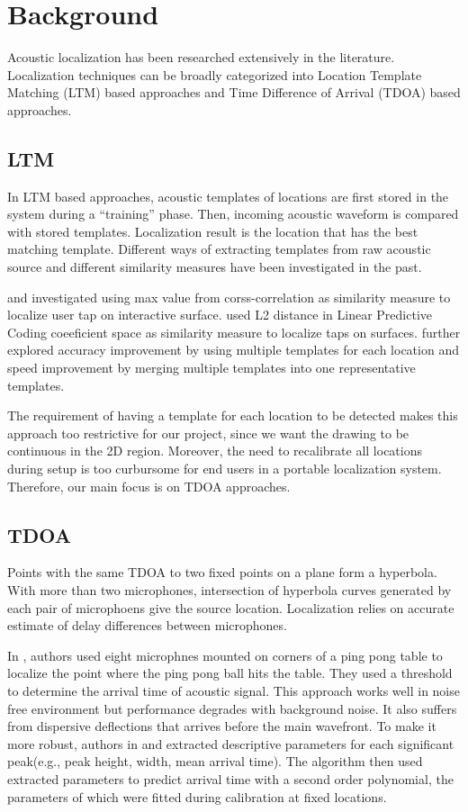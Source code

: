 \section{Background}
Acoustic localization has been researched extensively in the literature. Localization techniques can be broadly categorized into Location Template Matching (LTM) based approaches and Time Difference of Arrival (TDOA) based approaches.

\subsection{LTM}
In LTM based approaches, acoustic templates of locations are first stored in the system during a ``training'' phase. Then, incoming acoustic waveform is compared with stored templates. Localization result is the location that has the best matching template. Different ways of extracting templates from raw acoustic source and different similarity measures have been investigated in the past. 

\cite{extended:tusi} and \cite{ltm:pham} investigated using max value from corss-correlation as similarity measure to localize user tap on interactive surface. \cite{ltm:lpc} used L2 distance in Linear Predictive Coding coeeficient space as similarity measure to localize taps on surfaces. \cite{ltm:tusi2} further explored accuracy improvement by using multiple templates for each location and speed improvement by merging multiple templates into one representative templates.

The requirement of having a template for each location to be detected makes this approach too restrictive for our project, since we want the drawing to be continuous in the 2D region.  Moreover, the need to recalibrate all locations during setup is too curbursome for end users in a portable localization system. Therefore, our main focus is on TDOA approaches.

\subsection{TDOA}
Points with the same TDOA to two fixed points on a plane form a hyperbola. With more than two microphones, intersection of hyperbola curves generated by each pair of microphoens give the source location.  Localization relies on accurate estimate of delay differences between microphones. 

In \cite{tdoa:ppp}, authors used eight microphnes mounted on corners of a ping pong table to localize the point where the ping pong ball hits the table. They used a threshold to determine the arrival time of acoustic signal. This approach works well in noise free environment but performance degrades with background noise. It also suffers from dispersive deflections that arrives before the main wavefront. To make it more robust, authors in \cite{tdoa:mit3} and \cite{tdoa:mit4} extracted descriptive parameters for each significant peak(e.g., peak height, width, mean arrival time). The algorithm then used extracted parameters to predict arrival time with a second order polynomial, the parameters of which were fitted during calibration at fixed locations.

